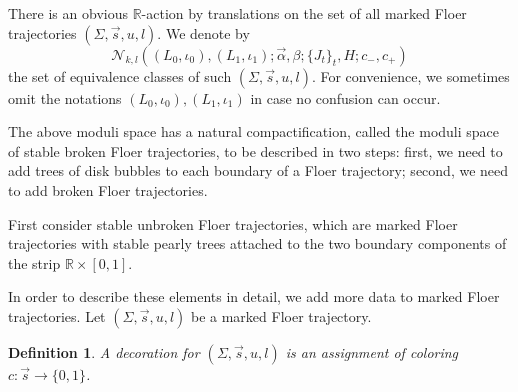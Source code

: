 \documentclass{amsart}
\newtheorem{definition}[theorem]{Definition}
\numberwithin{equation}{section}
\numberwithin{figure}{section}
\begin{document}
	There is an obvious $\mathbb{R}$-action by translations on the set of all marked Floer trajectories $(\Sigma, \vec{s}, u, l)$. We denote by
\begin{equation*}
\mathcal{N}_{k, l}((L_{0}, \iota_{0}), (L_{1}, \iota_{1}); \vec{\alpha}, \beta; \{J_{t}\}_{t}, H; c_{-}, c_{+})
\end{equation*}
the set of equivalence classes of such $(\Sigma, \vec{s}, u, l)$. For convenience, we sometimes omit the notations $(L_{0}, \iota_{0}), (L_{1}, \iota_{1})$ in case no confusion can occur. \par
	The above moduli space has a natural compactification, called the moduli space of stable broken Floer trajectories, to be described in two steps: first, we need to add trees of disk bubbles to each boundary of a Floer trajectory; second, we need to add broken Floer trajectories. \par
	First consider stable unbroken Floer trajectories, which are marked Floer trajectories with stable pearly trees attached to the two boundary components of the strip $\mathbb{R} \times [0, 1]$. \par
	In order to describe these elements in detail, we add more data to marked Floer trajectories. Let $(\Sigma, \vec{s}, u, l)$ be a marked Floer trajectory. \par

\begin{definition}
	A decoration for $(\Sigma, \vec{s}, u, l)$ is an assignment of coloring $c: \vec{s} \to \{0, 1\}$. \par
\end{definition}
\end{document}
